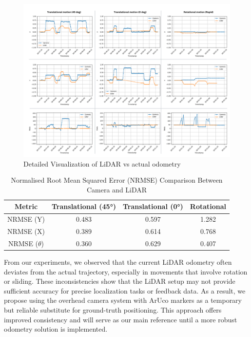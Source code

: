\begin{figure}[H]
    \centering
    \includegraphics[width=1\linewidth]{assets/images/odometry/detail_visual.png}
    \caption{Detailed Visualization of LiDAR vs actual odometry}
    \label{fig:detail-result}
\end{figure}

\begin{table}[H]
\centering
\begin{tabular}{|c|c|c|c|}
\hline
\textbf{Metric} & \textbf{Translational (45°)} & \textbf{Translational (0°)} & \textbf{Rotational} \\
\hline
NRMSE (Y) & 0.483 & 0.597 & 1.282 \\
NRMSE (X) & 0.389 & 0.614 & 0.768 \\
NRMSE ($\theta$) & 0.360 & 0.629 & 0.407 \\
\hline
\end{tabular}
\caption{Normalised Root Mean Squared Error (NRMSE) Comparison Between Camera and LiDAR}
\label{tab:mse-results}
\end{table}

From our experiments, we observed that the current LiDAR odometry often deviates from the actual trajectory, especially in movements that involve rotation or sliding. These inconsistencies show that the LiDAR setup may not provide sufficient accuracy for precise localization tasks or feedback data. As a result, we propose using the overhead camera system with ArUco markers as a temporary but reliable substitute for ground-truth positioning. This approach offers improved consistency and will serve as our main reference until a more robust odometry solution is implemented.
